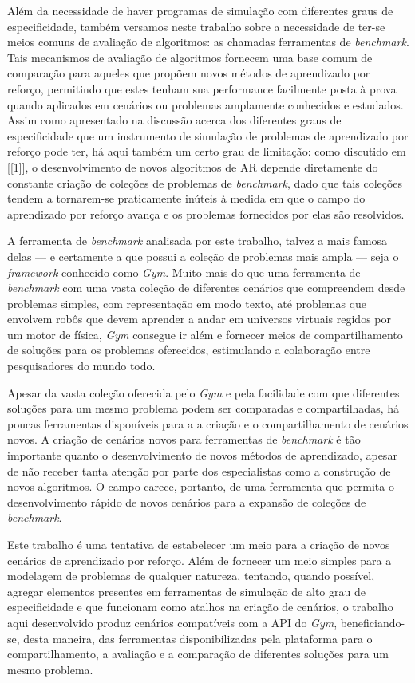 \documentclass[cic,tc]{iiufrgs}
\begin{document}
Além da necessidade de haver programas de simulação com diferentes graus de
especificidade, também versamos neste trabalho sobre a necessidade de ter-se
meios comuns de avaliação de algoritmos: as chamadas ferramentas de
\textit{benchmark}. Tais mecanismos de avaliação de algoritmos fornecem uma base
comum de comparação para aqueles que propõem novos métodos de aprendizado por
reforço, permitindo que estes tenham sua performance facilmente posta à prova
quando aplicados em cenários ou problemas amplamente conhecidos e estudados.
Assim como apresentado na discussão acerca dos diferentes graus de
especificidade que um instrumento de simulação de problemas de aprendizado por
reforço pode ter, há aqui também um certo grau de limitação: como discutido em
[[1]], o desenvolvimento de novos algoritmos de AR depende diretamente do
constante criação de coleções de problemas de \textit{benchmark}, dado que tais
coleções tendem a tornarem-se praticamente inúteis à medida em que o campo do
aprendizado por reforço avança e os problemas fornecidos por elas são
resolvidos.


A ferramenta de \textit{benchmark} analisada por este trabalho, talvez
a mais famosa delas --- e certamente a que possui a coleção de problemas mais
ampla --- seja o \textit{framework} conhecido como \textit{Gym}. Muito mais do
que uma ferramenta de \textit{benchmark} com uma vasta coleção de diferentes
cenários que compreendem desde problemas simples, com representação em modo
texto, até problemas que envolvem robôs que devem aprender a andar em universos
virtuais regidos por um motor de física, \textit{Gym} consegue ir além e
fornecer meios de compartilhamento de soluções para os problemas oferecidos,
estimulando a colaboração entre pesquisadores do mundo todo.


Apesar da vasta coleção oferecida pelo \textit{Gym} e pela facilidade com que
diferentes soluções para um mesmo problema podem ser comparadas e
compartilhadas, há poucas ferramentas disponíveis para a a criação e o
compartilhamento de cenários novos. A criação de cenários novos para ferramentas
de \textit{benchmark} é tão importante quanto o desenvolvimento de novos métodos
de aprendizado, apesar de não receber tanta atenção por parte dos especialistas
como a construção de novos algoritmos. O campo carece, portanto, de uma
ferramenta que permita o desenvolvimento rápido de novos cenários para a
expansão de coleções de \textit{benchmark}.


Este trabalho é uma tentativa de estabelecer um meio para a criação de novos
cenários de aprendizado por reforço. Além de fornecer um meio simples para a
modelagem de problemas de qualquer natureza, tentando, quando possível, agregar
elementos presentes em ferramentas de simulação de alto grau de especificidade e
que funcionam como atalhos na criação de cenários, o trabalho aqui desenvolvido
produz cenários compatíveis com a API do \textit{Gym}, beneficiando-se, desta
maneira, das ferramentas disponibilizadas pela plataforma para o
compartilhamento, a avaliação e a comparação de diferentes soluções para um
mesmo problema.
\end{document}
